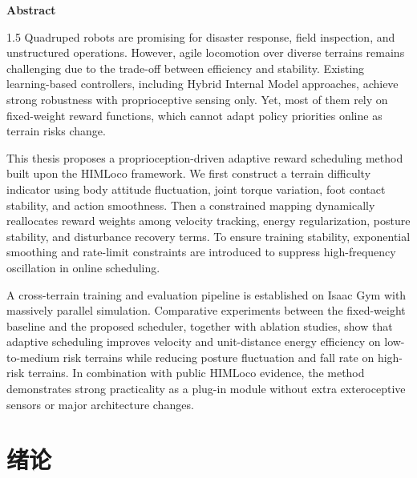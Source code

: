 \documentclass[12pt,a4paper]{ctexart}
\numberwithin{equation}{section}
\numberwithin{table}{section}
\numberwithin{figure}{section}
\begin{document}
\newpage
\vspace*{1em}
\begin{center}
{\bfseries{}Abstract}
\end{center}
\vspace{1em}
\begin{spacing}{1.5}
Quadruped robots are promising for disaster response, field inspection, and unstructured operations. However, agile locomotion over diverse terrains remains challenging due to the trade-off between efficiency and stability. Existing learning-based controllers, including Hybrid Internal Model approaches, achieve strong robustness with proprioceptive sensing only. Yet, most of them rely on fixed-weight reward functions, which cannot adapt policy priorities online as terrain risks change.

This thesis proposes a proprioception-driven adaptive reward scheduling method built upon the HIMLoco framework. We first construct a terrain difficulty indicator using body attitude fluctuation, joint torque variation, foot contact stability, and action smoothness. Then a constrained mapping dynamically reallocates reward weights among velocity tracking, energy regularization, posture stability, and disturbance recovery terms. To ensure training stability, exponential smoothing and rate-limit constraints are introduced to suppress high-frequency oscillation in online scheduling.

A cross-terrain training and evaluation pipeline is established on Isaac Gym with massively parallel simulation. Comparative experiments between the fixed-weight baseline and the proposed scheduler, together with ablation studies, show that adaptive scheduling improves velocity and unit-distance energy efficiency on low-to-medium risk terrains while reducing posture fluctuation and fall rate on high-risk terrains. In combination with public HIMLoco evidence, the method demonstrates strong practicality as a plug-in module without extra exteroceptive sensors or major architecture changes.

\vspace{1em}
\end{spacing}

\newpage
\tableofcontents

\newpage
\pagestyle{mainstyle}

\section{绪论}
\end{document}
